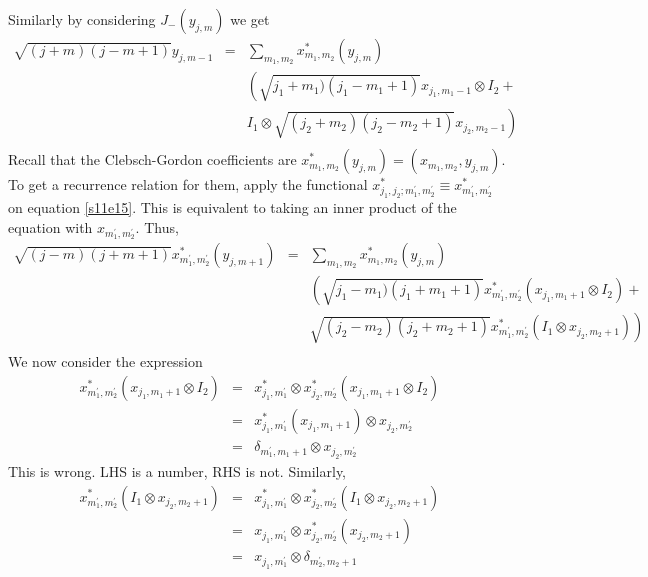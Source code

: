 \documentclass{article}
\numberwithin{equation}{section}
\theoremstyle{plain}
\numberwithin{thm}{section}
\theoremstyle{plain}
\numberwithin{prop}{section}
\theoremstyle{definition}
\numberwithin{defn}{section}
\theoremstyle{remark}
\begin{document}
Similarly by considering $J_-(y_{j,m})$ we get
\begin{eqnarray}
\sqrt{(j+m)(j-m+1)}y_{j,m-1} &=& \sum_{m_1,m_2}x_{m_1,m_2}^\ast (y_{j,m}) 
\nonumber \\
 & & \left(\sqrt{j_1+m_1)(j_1-m_1+1)}x_{j_1,m_1-1} \otimes I_2 + \right. 
\nonumber \\
 & & \left. I_1 \otimes \sqrt{(j_2+m_2)(j_2-m_2+1)}x_{j_2,m_2-1}\right)
\nonumber \\
 & & \label{s11e16}
\end{eqnarray}
Recall that the Clebsch-Gordon coefficients are $x_{m_1,m_2}^\ast(y_{j,m}) = 
(x_{m_1,m_2}, y_{j,m})$. To get a recurrence relation for them, apply the 
functional $x_{j_1,j_2;m_1^\prime, m_2^\prime}^\ast \equiv x_{m_1^\prime, 
m_2^\prime}^\ast$ on equation \eqref{s11e15}. This is equivalent to taking an 
inner product of the equation with $x_{m_1^\prime, m_2^\prime}$. Thus,
\begin{eqnarray}
\sqrt{(j-m)(j+m+1)}x^\ast_{m_1^\prime, m_2^\prime}(y_{j,m+1}) &=& 
 \sum_{m_1,m_2}x_{m_1,m_2}^\ast (y_{j,m}) 
\nonumber \\
 & & \left(\sqrt{j_1-m_1)(j_1+m_1+1)}x_{m_1^\prime, m_2^\prime}^\ast
(x_{j_1,m_1+1} \otimes I_2) + \right. 
\nonumber \\
 & & \left. \sqrt{(j_2-m_2)(j_2+m_2+1)}x_{m_1^\prime,m_2^\prime}^\ast
(I_1 \otimes x_{j_2,m_2+1})\right)
\nonumber \\
 & & \label{s11e17}
\end{eqnarray}
We now consider the expression
\begin{eqnarray}
x_{m_1^\prime, m_2^\prime}^\ast(x_{j_1,m_1+1} \otimes I_2) &=& 
x_{j_1, m_1^\prime}^\ast \otimes x_{j_2, m_2^\prime}^\ast
(x_{j_1,m_1+1} \otimes I_2)
\nonumber \\
 &=& x_{j_1, m_1^\prime}^\ast(x_{j_1,m_1+1}) \otimes x_{j_2, m_2^\prime}
\nonumber \\
 &=& \delta_{m_1^\prime, m_1+1} \otimes x_{j_2,m_2^\prime} \label{s11e18}
\end{eqnarray}
{\color{red}This is wrong. LHS is a number, RHS is not.}
Similarly,
\begin{eqnarray}
x_{m_1^\prime,m_2^\prime}^\ast(I_1 \otimes x_{j_2,m_2+1}) &=&
 x_{j_1,m_1^\prime}^\ast \otimes x_{j_2,m_2^\prime}^\ast
(I_1 \otimes x_{j_2,m_2+1}) \nonumber \\
 &=& x_{j_1,m_1^\prime} \otimes x_{j_2,m_2^\prime}^\ast(x_{j_2,m_2+1})
\nonumber \\
 &=& x_{j_1,m_1^\prime} \otimes \delta_{m_2^\prime,m_2+1} \label{s11e19}
\end{eqnarray}
\end{document}
